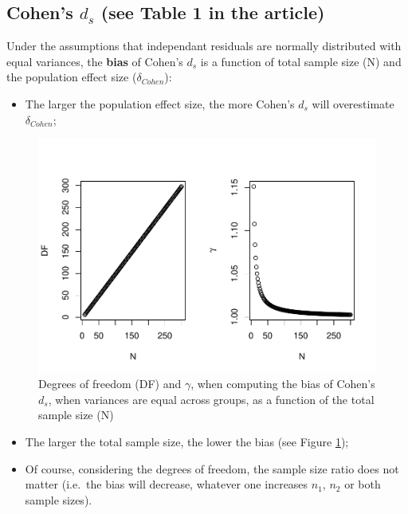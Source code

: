 \documentclass[
  man]{apa6}
\providecommand{\tightlist}{%
  \setlength{\itemsep}{0pt}\setlength{\parskip}{0pt}}
\begin{document}
\hypertarget{cohens-d_s-see-table-1-in-the-article}{%
\subsection{\texorpdfstring{Cohen's \(d_s\) (see Table 1 in the article)}{Cohen's d\_s (see Table 1 in the article)}}\label{cohens-d_s-see-table-1-in-the-article}}

Under the assumptions that independant residuals are normally distributed with equal variances, the \textbf{bias} of Cohen's \(d_s\) is a function of total sample size (N) and the population effect size (\(\delta_{Cohen}\)):

\begin{itemize}
\tightlist
\item
  The larger the population effect size, the more Cohen's \(d_s\) will overestimate \(\delta_{Cohen}\);
\end{itemize}

\begin{figure}
\centering
\includegraphics{Theoretical-Bias-of-all-estimators-as-a-function-of-population-parameters_files/figure-latex/biascohendNsize2-1.pdf}
\caption{\label{fig:biascohendNsize2}Degrees of freedom (DF) and \(\gamma\), when computing the bias of Cohen's \(d_s\), when variances are equal across groups, as a function of the total sample size (N)}
\end{figure}

\begin{itemize}
\item
  The larger the total sample size, the lower the bias (see Figure \ref{fig:biascohendNsize2});
\item
  Of course, considering the degrees of freedom, the sample size ratio does not matter (i.e.~the bias will decrease, whatever one increases \(n_1\), \(n_2\) or both sample sizes).
\end{itemize}
\end{document}
